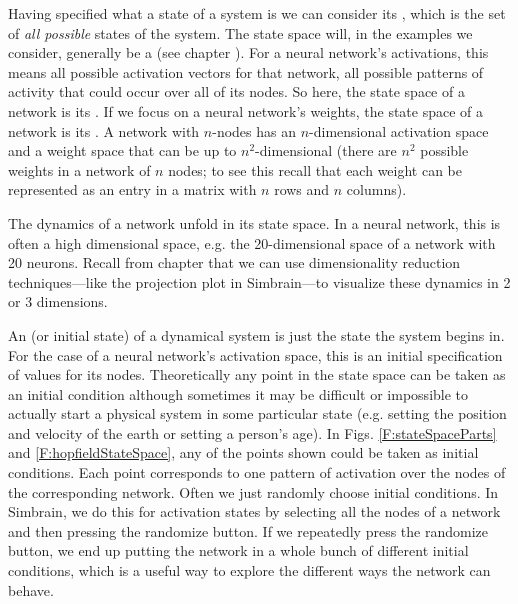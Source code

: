   Having specified what a state of a system is we can consider its  , which is the set of  {\em all  possible} states of the system. The state space will, in the examples we consider, generally be a  (see chapter ). For a neural network's activations, this means all possible activation vectors for that  network, all possible patterns of activity that could occur over all of its  nodes. So here, the state space of a network is its . If we focus on a neural network's weights, the state space of a network is  its . A network with $n$-nodes has an $n$-dimensional activation space and a weight space that can be up to $n^2$-dimensional (there are $n^2$ possible weights in a network of $n$ nodes; to see this recall that each weight can be represented as an entry in a matrix with $n$ rows and $n$ columns).

The dynamics of a network unfold in its state space. In a neural network, this is often a high dimensional space, e.g. the 20-dimensional space of a network with 20 neurons. Recall from chapter  that we can use dimensionality reduction techniques---like the projection plot in Simbrain---to visualize these dynamics in 2 or 3 dimensions.

 An  (or initial state) of a dynamical system is just the state the system begins in. For the case of a neural network's activation space, this is an initial 
specification of values for its  nodes. Theoretically any point in the state 
space can be taken as an initial condition although sometimes it may be 
difficult or impossible to actually start a physical system in some particular state (e.g. setting the position and velocity of the earth or setting a person's age). In Figs. \ref{F:stateSpaceParts} and \ref{F:hopfieldStateSpace}, any of the points shown could be taken as initial conditions. Each point corresponds to one pattern of  activation over the nodes of the corresponding network. Often we just randomly choose initial conditions.
In Simbrain, we do this for activation states by selecting all the nodes of a network and then 
pressing the randomize button. If we repeatedly press the randomize button, we end up 
putting the network in a whole bunch of different initial conditions, which is a useful way to explore the different ways the network can behave.

